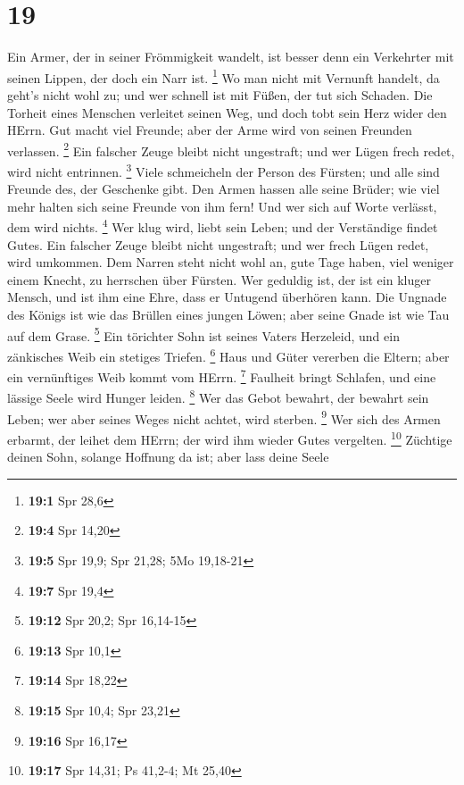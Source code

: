 \hypertarget{section-18}{%
\section{19}\label{section-18}}

 Ein Armer, der in seiner Frömmigkeit wandelt, ist besser
denn ein Verkehrter mit seinen Lippen, der doch ein Narr ist.
\footnote{\textbf{19:1} Spr 28,6}  Wo man nicht mit
Vernunft handelt, da geht's nicht wohl zu; und wer schnell ist mit
Füßen, der tut sich Schaden.  Die Torheit eines Menschen
verleitet seinen Weg, und doch tobt sein Herz wider den HErrn.
 Gut macht viel Freunde; aber der Arme wird von seinen
Freunden verlassen. \footnote{\textbf{19:4} Spr 14,20} 
Ein falscher Zeuge bleibt nicht ungestraft; und wer Lügen frech redet,
wird nicht entrinnen. \footnote{\textbf{19:5} Spr 19,9; Spr 21,28; 5Mo
  19,18-21}  Viele schmeicheln der Person des Fürsten; und
alle sind Freunde des, der Geschenke gibt.  Den Armen
hassen alle seine Brüder; wie viel mehr halten sich seine Freunde von
ihm fern! Und wer sich auf Worte verlässt, dem wird nichts. \footnote{\textbf{19:7}
  Spr 19,4}  Wer klug wird, liebt sein Leben; und der
Verständige findet Gutes.  Ein falscher Zeuge bleibt nicht
ungestraft; und wer frech Lügen redet, wird umkommen. 
Dem Narren steht nicht wohl an, gute Tage haben, viel weniger einem
Knecht, zu herrschen über Fürsten.  Wer geduldig ist, der
ist ein kluger Mensch, und ist ihm eine Ehre, dass er Untugend überhören
kann.  Die Ungnade des Königs ist wie das Brüllen eines
jungen Löwen; aber seine Gnade ist wie Tau auf dem Grase. \footnote{\textbf{19:12}
  Spr 20,2; Spr 16,14-15}  Ein törichter Sohn ist seines
Vaters Herzeleid, und ein zänkisches Weib ein stetiges Triefen.
\footnote{\textbf{19:13} Spr 10,1}  Haus und Güter
vererben die Eltern; aber ein vernünftiges Weib kommt vom HErrn.
\footnote{\textbf{19:14} Spr 18,22}  Faulheit bringt
Schlafen, und eine lässige Seele wird Hunger leiden. \footnote{\textbf{19:15}
  Spr 10,4; Spr 23,21}  Wer das Gebot bewahrt, der
bewahrt sein Leben; wer aber seines Weges nicht achtet, wird sterben.
\footnote{\textbf{19:16} Spr 16,17}  Wer sich des Armen
erbarmt, der leihet dem HErrn; der wird ihm wieder Gutes vergelten.
\footnote{\textbf{19:17} Spr 14,31; Ps 41,2-4; Mt 25,40} 
Züchtige deinen Sohn, solange Hoffnung da ist; aber lass deine Seele
